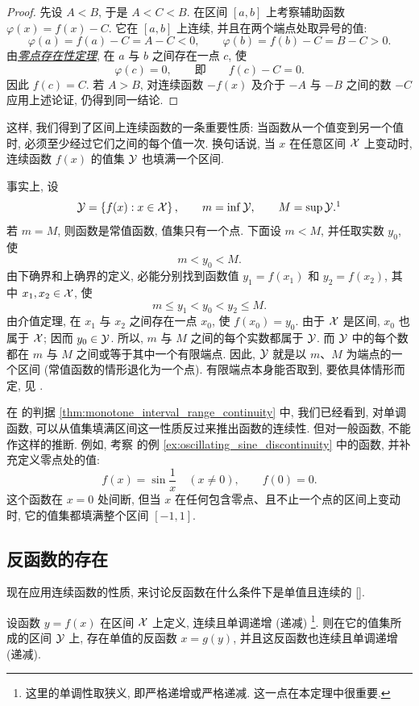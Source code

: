 \begin{proof}
先设 $A<B$, 于是 $A<C<B$.
在区间 $[a,b]$ 上考察辅助函数
$
\varphi(x)=f(x)-C.
$
它在 $[a,b]$ 上连续, 并且在两个端点处取异号的值:
$$
\varphi(a)=f(a)-C=A-C<0,\qquad
\varphi(b)=f(b)-C=B-C>0.
$$
由\hyperref[thm:bolzano_cauchy_zero]{\emph{零点存在性定理}}, 在 $a$ 与 $b$ 之间存在一点 $c$, 使
$$
\varphi(c)=0,\qquad\text{即}\qquad f(c)-C=0.
$$
因此 $f(c)=C$.
若 $A>B$, 对连续函数 $-f(x)$ 及介于 $-A$ 与 $-B$ 之间的数 $-C$
应用上述论证, 仍得到同一结论.
\end{proof}

这样, 我们得到了区间上连续函数的一条重要性质:
{\kaishu 当函数从一个值变到另一个值时, 必须至少经过它们之间的每个值一次.}
换句话说, 当 $x$ 在任意区间 $\mathcal{X}$ 上变动时,
连续函数 $f(x)$ 的值集 $\mathcal{Y}$ 也填满一个区间.

事实上, 设
$$
\Y=\bbbrac{f(x):x\in\X},\qquad
m=\inf\Y,\qquad M=\sup\Y.\footnotemark
$$
若 $m=M$, 则函数是常值函数, 值集只有一个点.
下面设 $m<M$, 并任取实数 $y_0$, 使
$$
m<y_0<M.
$$
由下确界和上确界的定义, 必能分别找到函数值
$y_1=f(x_1)$ 和 $y_2=f(x_2)$, 其中 $x_1,x_2\in\mathcal{X}$, 使
$$
m\leq y_1<y_0<y_2\leq M.
$$
由介值定理, 在 $x_1$ 与 $x_2$ 之间存在一点 $x_0$, 使 $f(x_0)=y_0$.
由于 $\mathcal{X}$ 是区间, $x_0$ 也属于 $\mathcal{X}$; 因而 $y_0\in\mathcal{Y}$.
所以, $m$ 与 $M$ 之间的每个实数都属于 $\mathcal{Y}$.
而 $\mathcal{Y}$ 中的每个数都在 $m$ 与 $M$ 之间或等于其中一个有限端点.
因此, $\mathcal{Y}$ 就是以 $m$、$M$ 为端点的一个区间
(常值函数的情形退化为一个点).
有限端点本身能否取到, 要依具体情形而定, 见 .

在  的判据 \ref{thm:monotone_interval_range_continuity} 中,
我们已经看到, 对单调函数, 可以从值集填满区间这一性质反过来推出函数的连续性.
但对一般函数, 不能作这样的推断.
例如, 考察  的例 \ref{ex:oscillating_sine_discontinuity} 中的函数, 并补充定义零点处的值:
$$
f(x)=\sin\frac1x\quad(x\neq0),\qquad f(0)=0.
$$
这个函数在 $x=0$ 处间断, 但当 $x$ 在任何包含零点、且不止一个点的区间上变动时,
它的值集都填满整个区间 $[-1,1]$.


\subsection{反函数的存在}\label{subsec:83}
现在应用连续函数的性质, 来讨论反函数在什么条件下是单值且连续的
[].

\begin{theorem}\label{thm:inverse_function_existence_continuity}
设函数 $y=f(x)$ 在区间 $\mathcal{X}$ 上定义, 连续且单调递增 (递减)
\footnote{这里的单调性取狭义, 即严格递增或严格递减. 这一点在本定理中很重要.}.
则在它的值集所成的区间 $\mathcal{Y}$ 上, 存在单值的反函数 $x=g(y)$,
并且这反函数也连续且单调递增 (递减).
\end{theorem}


